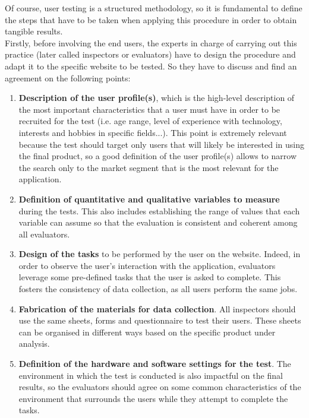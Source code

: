 Of course, user testing is a structured methodology, so it is fundamental to define the steps that have to be taken when applying this procedure in order to obtain tangible results.\\
Firstly, before involving the end users, the experts in charge of carrying out this practice (later called inspectors or evaluators) have to design the procedure and adapt it to the specific website to be tested. 
So they have to discuss and find an agreement on the following points:
\begin{enumerate}
	\item \textbf{Description of the user profile(s)}, which is the high-level description of the most important characteristics that a user must have in order to be recruited for the test (i.e. age range, level of experience with technology, interests and hobbies in specific fields...). This point is extremely relevant because the test should target only users that will likely be interested in using the final product, so a good definition of the user profile(s) allows to narrow the search only to the market segment that is the most relevant for the application.
	\item \textbf{Definition of quantitative and qualitative variables to measure} during the tests. This also includes establishing the range of values that each variable can assume so that the evaluation is consistent and coherent among all evaluators. 
	\item \textbf{Design of the tasks} to be performed by the user on the website. Indeed, in order to observe the user's interaction with the application, evaluators leverage some pre-defined tasks that the user is asked to complete. This fosters the consistency of data collection, as all users perform the same jobs.
	\item \textbf{Fabrication of the materials for data collection}. All inspectors should use the same sheets, forms and questionnaire to test their users. These sheets can be organised in different ways based on the specific product under analysis.
	\item \textbf{Definition of the hardware and software settings for the test}. The environment in which the test is conducted is also impactful on the final results, so the evaluators should agree on some common characteristics of the environment that surrounds the users while they attempt to complete the tasks.
	
\end{enumerate}

